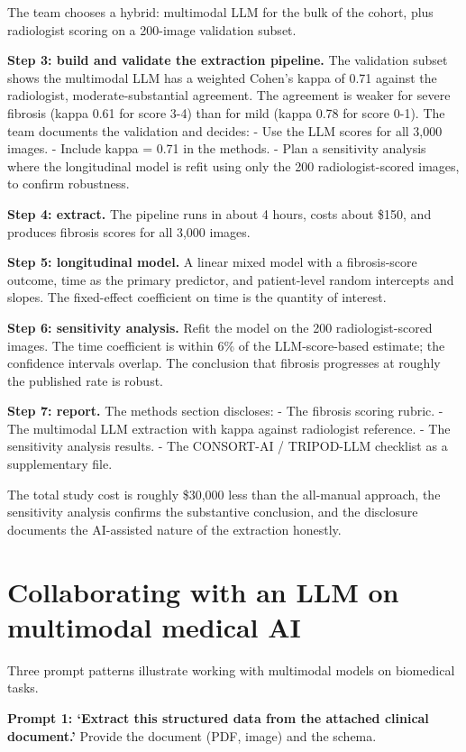 \documentclass[
  letterpaper,
  11pt]{scrbook}
\begin{document}
The team chooses a hybrid: multimodal LLM for the bulk of the cohort,
plus radiologist scoring on a 200-image validation subset.

\textbf{Step 3: build and validate the extraction pipeline.} The
validation subset shows the multimodal LLM has a weighted Cohen's kappa
of 0.71 against the radiologist, moderate-substantial agreement. The
agreement is weaker for severe fibrosis (kappa 0.61 for score 3-4) than
for mild (kappa 0.78 for score 0-1). The team documents the validation
and decides: - Use the LLM scores for all 3,000 images. - Include kappa
= 0.71 in the methods. - Plan a sensitivity analysis where the
longitudinal model is refit using only the 200 radiologist-scored
images, to confirm robustness.

\textbf{Step 4: extract.} The pipeline runs in about 4 hours, costs
about \$150, and produces fibrosis scores for all 3,000 images.

\textbf{Step 5: longitudinal model.} A linear mixed model with a
fibrosis-score outcome, time as the primary predictor, and patient-level
random intercepts and slopes. The fixed-effect coefficient on time is
the quantity of interest.

\textbf{Step 6: sensitivity analysis.} Refit the model on the 200
radiologist-scored images. The time coefficient is within 6\% of the
LLM-score-based estimate; the confidence intervals overlap. The
conclusion that fibrosis progresses at roughly the published rate is
robust.

\textbf{Step 7: report.} The methods section discloses: - The fibrosis
scoring rubric. - The multimodal LLM extraction with kappa against
radiologist reference. - The sensitivity analysis results. - The
CONSORT-AI / TRIPOD-LLM checklist as a supplementary file.

The total study cost is roughly \$30,000 less than the all-manual
approach, the sensitivity analysis confirms the substantive conclusion,
and the disclosure documents the AI-assisted nature of the extraction
honestly.

\section{Collaborating with an LLM on multimodal medical
AI}\label{collaborating-with-an-llm-on-multimodal-medical-ai}

Three prompt patterns illustrate working with multimodal models on
biomedical tasks.

\textbf{Prompt 1: `Extract this structured data from the attached
clinical document.'} Provide the document (PDF, image) and the schema.
\end{document}
